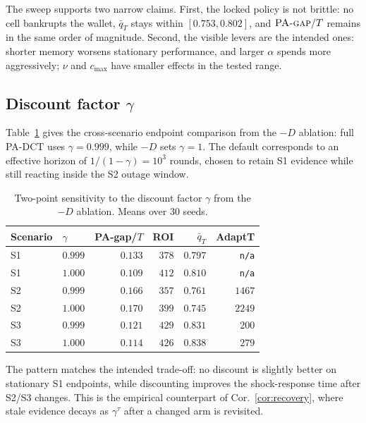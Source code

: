 The sweep supports two narrow claims. First, the locked policy is not brittle:
no cell bankrupts the wallet, $\bar q_T$ stays within $[0.753,0.802]$, and
$\textsc{PA-gap}/T$ remains in the same order of magnitude. Second, the visible
levers are the intended ones: shorter memory worsens stationary performance,
and larger $\alpha$ spends more aggressively; $\nu$ and $c_{\max}$ have smaller
effects in the tested range.

\subsection{\texorpdfstring{Discount factor $\gamma$}{Discount factor gamma}}
\label{app:sens-gamma}

Table~\ref{tab:gamma-sensitivity} gives the cross-scenario endpoint comparison
from the $-D$ ablation: full PA-DCT uses $\gamma=0.999$, while $-D$ sets
$\gamma=1$. The default corresponds to an effective horizon of
$1/(1-\gamma)=10^3$ rounds, chosen to retain S1 evidence while still reacting
inside the S2 outage window.

\begin{table}[H]
\centering
\footnotesize
\setlength{\tabcolsep}{2pt}
\renewcommand{\arraystretch}{0.98}
\caption{Two-point sensitivity to the discount factor $\gamma$ from the $-D$
ablation. Means over $30$ seeds.}
\label{tab:gamma-sensitivity}
\begin{tabular*}{\columnwidth}{@{\extracolsep{\fill}}llrrrr@{}}
\toprule
Scenario & $\gamma$ & PA-gap/$T$ & ROI & $\bar q_T$ & AdaptT \\
\midrule
S1 & $0.999$ & $0.133$ & $378$ & $0.797$ & \texttt{n/a} \\
S1 & $1.000$ & $0.109$ & $412$ & $0.810$ & \texttt{n/a} \\
S2 & $0.999$ & $0.166$ & $357$ & $0.761$ & $1467$ \\
S2 & $1.000$ & $0.170$ & $399$ & $0.745$ & $2249$ \\
S3 & $0.999$ & $0.121$ & $429$ & $0.831$ & $200$ \\
S3 & $1.000$ & $0.114$ & $426$ & $0.838$ & $279$ \\
\bottomrule
\end{tabular*}
\end{table}

The pattern matches the intended trade-off: no discount is slightly
better on stationary S1 endpoints, while discounting improves the shock-response
time after S2/S3 changes. This is the empirical counterpart of
Cor.~\ref{cor:recovery}, where stale evidence decays as $\gamma^\tau$ after a
changed arm is revisited.

